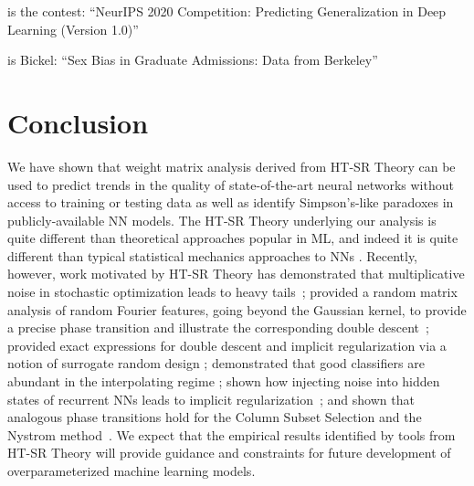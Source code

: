 \documentclass{article}
\newcommand{\michael}[1]{{\color{red}\sf{[Michael: #1]}}}
\begin{document}
\citep{JFYx20_contest_v10} is the contest: ``{NeurIPS} 2020 Competition: Predicting Generalization in Deep Learning (Version 1.0)''

\citep{BHO75} is Bickel: ``Sex Bias in Graduate Admissions: Data from Berkeley''




\section{Conclusion}

\michael{I may cut this stuff.}
We have shown that weight matrix analysis derived from HT-SR Theory can be used to predict trends in the quality of state-of-the-art neural networks without access to training or testing data as well as identify Simpson's-like paradoxes in publicly-available NN models.
The HT-SR Theory underlying our analysis is quite different than theoretical approaches popular in ML, and indeed it is quite different than typical statistical mechanics approaches to NNs \citep{BKPx20}.
Recently, however, work motivated by HT-SR Theory has 
demonstrated that multiplicative noise in stochastic optimization leads to heavy tails~\citep{HodMah20A_TR,GSZ20_TR}; 
provided a random matrix analysis of random {F}ourier features, going beyond the {G}aussian kernel, to provide a precise phase transition and illustrate the corresponding double descent~\citep{ZCM20_TR}; 
provided exact expressions for double descent and implicit regularization via a notion of surrogate random design \citep{DLM19_Exact_TR}; 
demonstrated that good classifiers are abundant in the interpolating regime \citep{TKM20_TR};
shown how injecting noise into hidden states of recurrent NNs leads to implicit regularization~\citep{LEHM21_TR,Mah12}; and 
shown that analogous phase transitions hold for the {C}olumn {S}ubset {S}election and the {N}ystrom method~\citep{DKM20_TR}. 
We expect that the empirical results identified by tools from HT-SR Theory will provide guidance and constraints for future development of overparameterized machine learning models.




\end{document}
